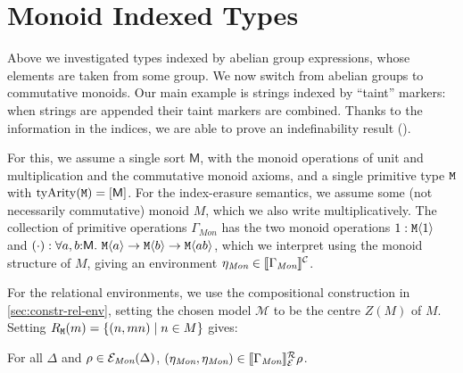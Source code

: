 \section{Monoid Indexed Types}
\label{sec:monoid-indexed-types}

\newcommand{\Mon}{\textit{Mon}}

Above we investigated types indexed by abelian group expressions,
whose elements are taken from some group. We now switch from abelian
groups to commutative monoids.  Our main example is strings indexed by
``taint'' markers: when strings are appended their taint markers are
combined. Thanks to the information in the indices, we are able to
prove an indefinability result ().

For this, we assume a single sort $\mathsf{M}$, with the monoid operations of
unit and multiplication and the commutative monoid axioms, and a %
single primitive type $\textup{\texttt{M}}$ with $\mathrm{tyArity}(\textup{\texttt{M}})
= [\mathsf{M}]$. For the index-erasure semantics, we assume some (not
necessarily commutative) monoid $M$, which we 
also write
multiplicatively. The collection of primitive operations
$\Gamma_{\mathit{Mon}}$ %
has the two monoid operations
$1 : \textup{\texttt{M}}\langle 1 \rangle$ and $(\cdot) : \forall
a,b\mathord:\mathsf{M}.\ \textup{\texttt{M}}\langle a \rangle \to \textup{\texttt{M}}\langle b \rangle \to
\textup{\texttt{M}}\langle a b \rangle$, which we interpret using the monoid structure of
$M$, giving an environment $\eta_\Mon \in \ctxtSem{\Gamma_\Mon}$.

For the relational environments, we use %
the compositional
construction in \autoref{sec:constr-rel-env}, setting the chosen model
$\mathcal{M}$ to be the centre $Z(M)$ of $M$. %
Setting $R_{\textup{\texttt{M}}}(m) = \{ (n,mn) \mathrel| n
\in M \}$
gives:
\begin{lemma}\label{lem:monoid-ops-related}
  For all $\Delta$ and $\rho \in \relEnv{E}_\Mon(\Delta)$,
  $(\eta_\Mon,\eta_\Mon) \in \rsem{\Gamma_\Mon}{\relEnv{E}}\rho$.
\end{lemma}

